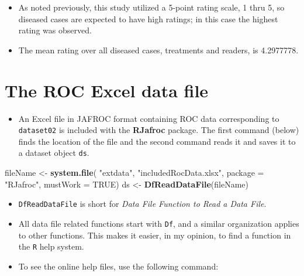 \documentclass[]{book}
\newenvironment{Shaded}{\begin{snugshade}}{\end{snugshade}}
\newcommand{\CommentTok}[1]{\textcolor[rgb]{0.56,0.35,0.01}{\textit{#1}}}
\newcommand{\DataTypeTok}[1]{\textcolor[rgb]{0.13,0.29,0.53}{#1}}
\newcommand{\DecValTok}[1]{\textcolor[rgb]{0.00,0.00,0.81}{#1}}
\newcommand{\KeywordTok}[1]{\textcolor[rgb]{0.13,0.29,0.53}{\textbf{#1}}}
\newcommand{\NormalTok}[1]{#1}
\newcommand{\OperatorTok}[1]{\textcolor[rgb]{0.81,0.36,0.00}{\textbf{#1}}}
\newcommand{\OtherTok}[1]{\textcolor[rgb]{0.56,0.35,0.01}{#1}}
\newcommand{\StringTok}[1]{\textcolor[rgb]{0.31,0.60,0.02}{#1}}
\providecommand{\tightlist}{%
  \setlength{\itemsep}{0pt}\setlength{\parskip}{0pt}}
\begin{document}
\begin{Shaded}
\end{Shaded}

\begin{itemize}
\tightlist
\item
  As noted previously, this study utilized a 5-point rating scale, 1 thru 5, so diseased cases are expected to have high ratings; in this case the highest rating was observed.
\item
  The mean rating over all diseased cases, treatments and readers, is 4.2977778.
\end{itemize}

\hypertarget{the-roc-excel-data-file}{%
\section{The ROC Excel data file}\label{the-roc-excel-data-file}}

\begin{itemize}
\tightlist
\item
  An Excel file in JAFROC format containing ROC data corresponding to \texttt{dataset02} is included with the \textbf{RJafroc} package. The first command (below) finds the location of the file and the second command reads it and saves it to a dataset object \texttt{ds}.
\end{itemize}

\begin{Shaded}
\begin{Highlighting}[]
\NormalTok{fileName <-}\StringTok{ }\KeywordTok{system.file}\NormalTok{(}
    \StringTok{"extdata"}\NormalTok{, }\StringTok{"includedRocData.xlsx"}\NormalTok{, }\DataTypeTok{package =} \StringTok{"RJafroc"}\NormalTok{, }\DataTypeTok{mustWork =} \OtherTok{TRUE}\NormalTok{)}
\NormalTok{ds <-}\StringTok{ }\KeywordTok{DfReadDataFile}\NormalTok{(fileName)}
\end{Highlighting}
\end{Shaded}

\begin{itemize}
\tightlist
\item
  \texttt{DfReadDataFile} is short for \emph{Data File Function to Read a Data File}.
\item
  All data file related functions start with \texttt{Df}, and a similar organization applies to other functions. This makes it easier, in my opinion, to find a function in the \texttt{R} help system.
\item
  To see the online help files, use the following command:
\end{itemize}
\end{document}
